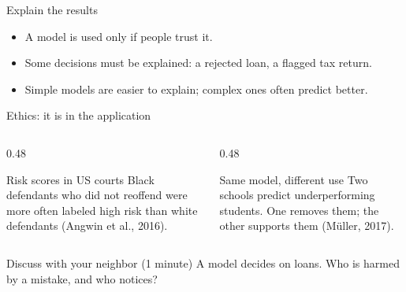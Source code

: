 \documentclass[handout,aspectratio=169,t,9pt]{beamer}
\begin{document}
\begin{frame}{Explain the results}
  \vspace{0.3cm}
  \begin{itemize}
    \item A model is used only if people trust it.
    \item Some decisions must be explained: a rejected loan, a flagged tax
          return.
    \item Simple models are easier to explain; complex ones often predict
          better.
  \end{itemize}

\end{frame}

\begin{frame}{Ethics: it is in the application}
  \begin{columns}[T,onlytextwidth]
    \begin{column}{0.48\textwidth}
      \begin{sibbox}{Risk scores in US courts}
        Black defendants who did not reoffend were more often labeled
        high risk than white defendants (Angwin et al., 2016).
      \end{sibbox}
    \end{column}
    \begin{column}{0.48\textwidth}
      \begin{sibbox}{Same model, different use}
        Two schools predict underperforming students.  One removes them;
        the other supports them (M\"{u}ller, 2017).
      \end{sibbox}
    \end{column}
  \end{columns}

  \vfill
  \begin{keypoint}{Discuss with your neighbor (1 minute)}
    A model decides on loans.  Who is harmed by a mistake, and who notices?
  \end{keypoint}

\end{frame}
\end{document}
